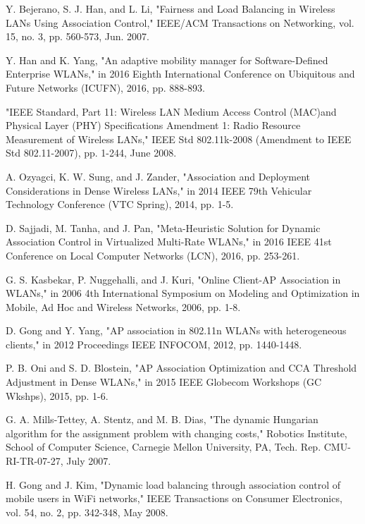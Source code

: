 \begin{thebibliography}{1}
 Y. Bejerano, S. J. Han, and L. Li, "Fairness and Load Balancing in Wireless LANs Using Association Control," IEEE/ACM Transactions on Networking, vol. 15, no. 3, pp. 560-573, Jun. 2007.


 Y. Han and K. Yang, "An adaptive mobility manager for Software-Defined Enterprise WLANs," in 2016 Eighth International Conference on Ubiquitous and Future Networks (ICUFN), 2016, pp. 888-893.

 "IEEE Standard, Part 11: Wireless LAN Medium Access Control (MAC)and Physical Layer (PHY) Specifications Amendment 1: Radio
Resource Measurement of Wireless LANs," IEEE Std 802.11k-2008 (Amendment to IEEE Std 802.11-2007), pp. 1-244, June 2008.

 A. Ozyagci, K. W. Sung, and J. Zander, "Association and Deployment Considerations in Dense Wireless LANs," in 2014 IEEE 79th Vehicular Technology Conference (VTC Spring), 2014, pp. 1-5.

 D. Sajjadi, M. Tanha, and J. Pan, "Meta-Heuristic Solution for Dynamic Association Control in Virtualized Multi-Rate WLANs," in 2016 IEEE 41st Conference on Local Computer Networks (LCN), 2016, pp. 253-261.

 G. S. Kasbekar, P. Nuggehalli, and J. Kuri, "Online Client-AP Association in WLANs," in 2006 4th International Symposium on Modeling and Optimization in Mobile, Ad Hoc and Wireless Networks, 2006, pp. 1-8.

 D. Gong and Y. Yang, "AP association in 802.11n WLANs with heterogeneous clients," in 2012 Proceedings IEEE INFOCOM, 2012, pp. 1440-1448.

 P. B. Oni and S. D. Blostein, "AP Association Optimization and CCA Threshold Adjustment in Dense WLANs," in 2015 IEEE Globecom Workshops (GC Wkshps), 2015, pp. 1-6.

 G. A. Mills-Tettey, A. Stentz, and M. B. Dias, "The dynamic Hungarian algorithm for the assignment problem with changing costs," Robotics Institute, School of Computer Science, Carnegie Mellon University, PA, Tech. Rep. CMU-RI-TR-07-27, July 2007.

 H. Gong and J. Kim, "Dynamic load balancing through association control of mobile users in WiFi networks," IEEE Transactions on Consumer Electronics, vol. 54, no. 2, pp. 342-348, May 2008.



\end{thebibliography}
